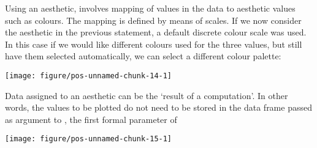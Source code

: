 \documentclass[paper=a4,10pt,div=17,headsepline,BCOR=12mm,twoside,open=right]{scrbook}\usepackage{knitr}
\begin{document}
Using an aesthetic, involves mapping of values in the data to aesthetic values such as colours. The mapping is defined by means of scales. If we now consider the  aesthetic in the previous statement, a default discrete colour scale was used. In this case if we would like different colours used for the three values, but still have them selected automatically, we can select a different colour palette:

\begin{knitrout}\footnotesize
{}\color{fgcolor}\begin{kframe}
\begin{alltt}
\hlstd{(} 
       \hlstd{(}     \hlstd{=}  \hlopt{+}
  \hlstd{(} \hlstd{=} \hlstd{(}\hlstd{))} \hlopt{+}
  \hlstd{(} \hlstd{=} \hlstd{,}  \hlstd{=} \hlstd{)} \hlopt{+}
  \hlstd{(}\hlstd{)}
\end{alltt}
\end{kframe}

{\centering \texttt{[image: figure/pos-unnamed-chunk-14-1]} 

}



\end{knitrout}

Data assigned to an aesthetic can be the `result of a computation'. In other words, the values to be plotted do not need to be stored in the data frame passed as argument to , the first formal parameter of 

\begin{knitrout}\footnotesize
{}\color{fgcolor}\begin{kframe}
\begin{alltt}
\hlstd{(} 
       \hlstd{(} \hlstd{=}    \hlopt{/}  \hlopt{+}
  \hlstd{()}
\end{alltt}
\end{kframe}

{\centering \texttt{[image: figure/pos-unnamed-chunk-15-1]} 

}



\end{knitrout}
\end{document}
